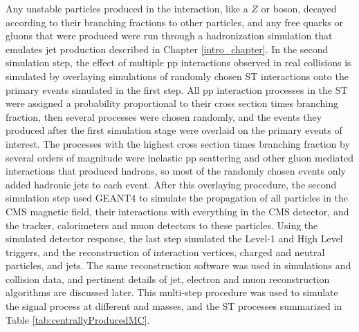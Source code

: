 Any unstable particles produced in the interaction, like a $Z$ or \WR boson, decayed according to 
their branching fractions to other particles, and any free quarks or gluons that were produced were 
run through a hadronization simulation that emulates jet production described in Chapter \ref{intro_chapter}.  In the second 
simulation step, the effect of multiple pp interactions observed in real collisions is simulated by 
overlaying simulations of randomly chosen ST interactions onto the primary events simulated in the first 
step.  All pp interaction processes in the ST were assigned a probability proportional to their cross section 
times branching fraction, then several processes were chosen randomly, and the events they produced after 
the first simulation stage were overlaid on the primary events of interest.  The processes with the highest cross section times 
branching fraction by several orders of magnitude were inelastic pp scattering and 
other gluon mediated interactions that produced hadrons, so most of the randomly chosen events only added 
hadronic jets to each event.  After this overlaying procedure, the second simulation step used GEANT4 \cite{geant4} to simulate 
the propagation of all particles in the CMS magnetic field, their interactions with everything in the CMS detector, 
and the tracker, calorimeters and muon detectors to these particles.  Using the simulated detector response, 
the last step simulated the Level-1 and High Level triggers, and the reconstruction of interaction 
vertices, charged and neutral particles, and jets.  The same reconstruction software 
was used in simulations and collision data, and pertinent details of jet, electron and muon reconstruction 
algorithms are discussed later.  This multi-step procedure 
was used to simulate the \WR signal process at different \mWR and \mnul masses, and the ST processes 
summarized in Table \ref{tab:centrallyProducedMC}.


